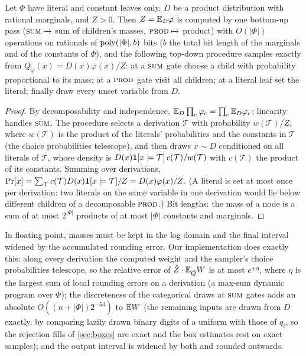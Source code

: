 \begin{lemma}\label{lem:envmass}
Let $\Phi$ have literal and constant leaves only, $D$ be a product distribution
with rational marginals, and $Z>0$. Then $Z=\mathbb{E}_D\varphi$ is computed by one
bottom-up pass ($\textsc{sum}\mapsto$ sum of children's masses, $\textsc{prod}\mapsto$ product)
with $O(|\Phi|)$ operations on rationals of $\mathrm{poly}(|\Phi|,b)$ bits ($b$ the total
bit length of the marginals and of the constants of $\Phi$), and the following
top-down procedure samples exactly from $Q_\varphi(x)=D(x)\varphi(x)/Z$: at a
$\textsc{sum}$ gate choose a child with probability proportional to its mass; at a
$\textsc{prod}$ gate visit all children; at a literal leaf set the literal; finally draw
every unset variable from $D$.
\end{lemma}

\begin{proof}
By decomposability and independence, $\mathbb{E}_D\prod_c\varphi_c=\prod_c\mathbb{E}_D\varphi_c$;
linearity handles $\textsc{sum}$. The procedure selects a derivation $\mathcal T$ with
probability $w(\mathcal T)/Z$, where $w(\mathcal T)$ is the product of the
literals' probabilities and the constants in $\mathcal T$ (the choice probabilities
telescope), and then draws $x\sim D$ conditioned on all literals of $\mathcal T$,
whose density is $D(x)\mathbf{1}[x\models\mathcal T]\,c(\mathcal T)/w(\mathcal T)$ with
$c(\mathcal T)$ the product of its constants. Summing over derivations,
$\Pr[x]=\sum_{\mathcal T}c(\mathcal T)D(x)\mathbf{1}[x\models\mathcal T]/Z=D(x)\varphi(x)/Z$.
(A literal is set at most once per derivation: two literals on the same variable
in one derivation would lie below different children of a decomposable $\textsc{prod}$.)
Bit lengths: the mass of a node is a sum of at most $2^{|\Phi|}$ products of at most
$|\Phi|$ constants and marginals.
\end{proof}

In floating point, masses must be kept in the log domain and the final interval
widened by the accumulated rounding error. Our implementation does exactly this:
along every derivation the computed weight and the sampler's choice probabilities
telescope, so the relative error of $\hat Z\cdot\mathbb{E}_{\hat Q}W$ is at most
$e^{\pm\eta}$, where $\eta$ is the largest sum of local rounding errors on a
derivation (a max-sum dynamic program over $\Phi$); the discreteness of the
categorical draws at $\textsc{sum}$ gates adds an absolute $O((n+|\Phi|)2^{-53})$ to $\mathbb{E} W$
(the remaining inputs are drawn from $D$ exactly, by comparing lazily drawn binary
digits of a uniform with those of $q_i$, so the rejection fills of
\cref{sec:boxes} are exact and the box estimates rest on exact samples); and the
output interval is widened by both and rounded outwards.

